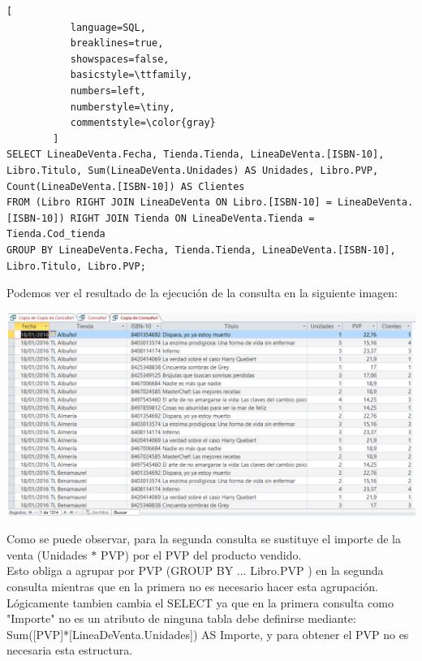 \documentclass[paper=a4, fontsize=11pt, spanish]{scrartcl}
\numberwithin{equation}{section} %
\numberwithin{figure}{section} %
\numberwithin{table}{section} %
\begin{document}
\begin{lstlisting}[
           language=SQL,
           breaklines=true,
           showspaces=false,
           basicstyle=\ttfamily,
           numbers=left,
           numberstyle=\tiny,
           commentstyle=\color{gray}
        ]
SELECT LineaDeVenta.Fecha, Tienda.Tienda, LineaDeVenta.[ISBN-10], Libro.Titulo, Sum(LineaDeVenta.Unidades) AS Unidades, Libro.PVP, Count(LineaDeVenta.[ISBN-10]) AS Clientes
FROM (Libro RIGHT JOIN LineaDeVenta ON Libro.[ISBN-10] = LineaDeVenta.[ISBN-10]) RIGHT JOIN Tienda ON LineaDeVenta.Tienda = Tienda.Cod_tienda
GROUP BY LineaDeVenta.Fecha, Tienda.Tienda, LineaDeVenta.[ISBN-10], Libro.Titulo, Libro.PVP;
\end{lstlisting}

Podemos ver el resultado de la ejecución de la consulta en la siguiente imagen:\\
\begin{center}
	\includegraphics[scale=0.35]{2-zoom.png}
\end{center}
Como se puede observar, para la segunda consulta se sustituye el importe de la venta (Unidades $\ast$ PVP) por el PVP del producto vendido.\\
Esto obliga a agrupar por PVP (GROUP BY ... Libro.PVP ) en la segunda consulta mientras que en la primera no es necesario hacer esta agrupación.\\
Lógicamente tambien cambia el SELECT ya que en la primera consulta como "Importe" no es un atributo de ninguna tabla debe definirse mediante: Sum([PVP]*[LineaDeVenta.Unidades]) AS Importe, y para obtener el PVP no es necesaria esta estructura.
\end{document}

